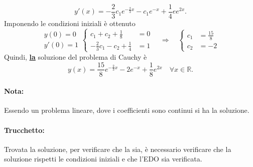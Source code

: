 \begin{example}
\begin{equation*}
		y'(x) = -\frac{2}{3} c_1 e^{-\frac{2}{3}x} - c_1 e^{-x} + \frac{1}{4}ee^{2x}.
	\end{equation*}
	Imponendo le condizioni iniziali è ottenuto
	\begin{equation*}
		\begin{matrix}
			y(0)=0\\
			y'(0)=1
		\end{matrix}
		\begin{cases}
			c_1 +c_2+ \frac{1}{8} &=0\\
			-\frac{2}{3} c_1 - c_2 + \frac{1}{4} &= 1
		\end{cases}\quad\Rightarrow\quad
		\begin{cases}
			c_1 &=\frac{15}{8}\\
			c_2 &= -2
		\end{cases}
	\end{equation*}
	Quindi, \ul{\textbf{la}} soluzione del problema di Cauchy è
	\begin{equation*}
		y(x) = \frac{15}{8} e^{-\frac{2}{3}x} - 2 e^{-x} + \frac{1}{8} e^{2x}\quad\forall x\in\mathbb{R}.
	\end{equation*}
	\paragraph{Nota:} Essendo un problema lineare, dove i coefficienti sono continui si ha la soluzione.
	\paragraph{Trucchetto:} Trovata la soluzione, per verificare che la sia, è necessario verificare che la soluzione rispetti le condizioni iniziali e che l'EDO sia verificata.
\end{example}

